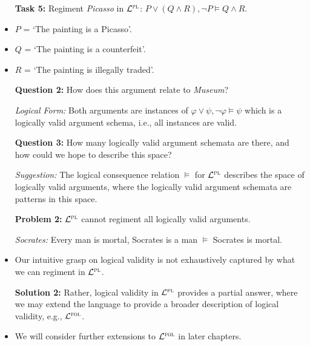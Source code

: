 \documentclass[a4paper, 11pt]{article} %
\begin{document}
\begin{itemize}[leftmargin=1in,labelsep=.15in]
  \item[\bf Task 5:] Regiment \textit{Picasso} in $\mathcal{L}^{\textsc{pl}}$: $P\vee (Q\wedge R), \neg P \vDash Q\wedge R$.
    \item $P$ = `The painting is a Picasso'. 
    \item $Q$ = `The painting is a counterfeit'. 
    \item $R$ = `The painting is illegally traded'. 
  \item[\bf Question 2:] How does this argument relate to \textit{Museum}? 
  \item[\it Logical Form:] Both arguments are instances of $\varphi \vee \psi, \neg\varphi \vDash \psi$ which is a logically valid argument schema, i.e., all instances are valid. 
  \item[\bf Question 3:] How many logically valid argument schemata are there, and how could we hope to describe this space?
  \item[\it Suggestion:] The logical consequence relation $\vDash$ for $\mathcal{L}^{\textsc{pl}}$ describes the space of logically valid arguments, where the logically valid argument schemata are patterns in this space.
  \item[\bf Problem 2:] $\mathcal{L}^{\textsc{pl}}$ cannot regiment all logically valid arguments.
  \item[\it Socrates:] Every man is mortal, Socrates is a man $\vDash$ Socrates is mortal. 
    \item Our intuitive grasp on logical validity is not exhaustively captured by what we can regiment in $\mathcal{L}^{\textsc{pl}}$.
  \item[\bf Solution 2:] Rather, logical validity in $\mathcal{L}^{\textsc{pl}}$ provides a partial answer, where we may extend the language to provide a broader description of logical validity, e.g., $\mathcal{L}^{\textsc{fol}}$.
    \item We will consider further extensions to $\mathcal{L}^{\textsc{fol}}$ in later chapters. 
\end{itemize}
\end{document}
